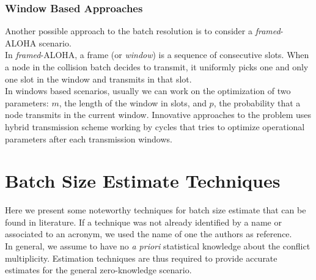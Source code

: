 \documentclass[11pt,a4paper,twoside,openright]{book}
\begin{document}
\subsection{Window Based Approaches}

Another possible approach to the batch resolution is to consider a \emph{framed}-ALOHA scenario.\\
In \emph{framed}-ALOHA, a frame (or \emph{window}) is a sequence of consecutive slots.  When a node in the collision batch decides to transmit, it uniformly picks one and only one slot in the window and transmits in that slot.\\
In windows based scenarios, usually we can work on the optimization of two parameters: $m$, the length of the window in slots, and $p$, the probability that a node transmits in the current window.
Innovative approaches to the problem uses hybrid transmission scheme working by cycles that tries to optimize operational parameters after each transmission windows.


\chapter{Batch Size Estimate Techniques}
\label{ch:Batch Size Estimate Techniques}
Here we present some noteworthy techniques for batch size estimate that can be found in literature.
If a technique was not already identified by a name or associated to an acronym, we used the name of one the authors as reference.\\

In general, we assume to have no \emph{a priori} statistical knowledge about the conflict multiplicity. Estimation techniques are thus required to provide accurate estimates for the general zero-knowledge scenario.\\
\end{document}
